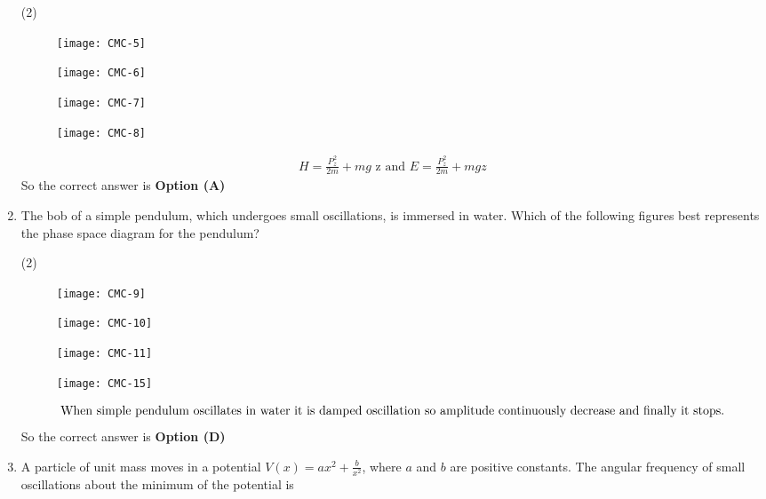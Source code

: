 \begin{enumerate}
\begin{tasks}(2)
\task[\textbf{A.}] \begin{figure}[H]
	\centering
	\texttt{[image: CMC-5]}
\end{figure}
\task[\textbf{B.}] \begin{figure}[H]
	\centering
	\texttt{[image: CMC-6]}
\end{figure}
\task[\textbf{C.}] \begin{figure}[H]
	\centering
	\texttt{[image: CMC-7]}
\end{figure}
\task[\textbf{D.}] \begin{figure}[H]
	\centering
	\texttt{[image: CMC-8]}
\end{figure}
\end{tasks}
\begin{answer}
\begin{align*}
H=\frac{P_{z}^{2}}{2 m}+m g\text{ z and }E=\frac{P_{z}^{2}}{2 m}+m g z
\end{align*}
So the correct answer is \textbf{Option (A)}	
\end{answer}
\item The bob of a simple pendulum, which undergoes small oscillations, is immersed in water. Which of the following figures best represents the phase space diagram for the pendulum?
{}
\begin{tasks}(2)
\task[\textbf{A.}] \begin{figure}[H]
	\centering
	\texttt{[image: CMC-9]}
\end{figure}
\task[\textbf{B.}] \begin{figure}[H]
	\centering
	\texttt{[image: CMC-10]}
\end{figure}
\task[\textbf{C.}] \begin{figure}[H]
	\centering
	\texttt{[image: CMC-11]}
\end{figure}
\task[\textbf{D.}] \begin{figure}[H]
	\centering
	\texttt{[image: CMC-15]}
\end{figure}
\end{tasks}
\begin{answer}
\begin{align*}
\intertext{When simple pendulum oscillates in water it is damped oscillation so amplitude continuously decrease and finally it stops.}
\end{align*}
So the correct answer is \textbf{Option (D)}
\end{answer}
\item A particle of unit mass moves in a potential $V(x)=a x^{2}+\frac{b}{x^{2}}$, where $a$ and $b$ are positive constants. The angular frequency of small oscillations about the minimum of the potential is


\end{enumerate}
